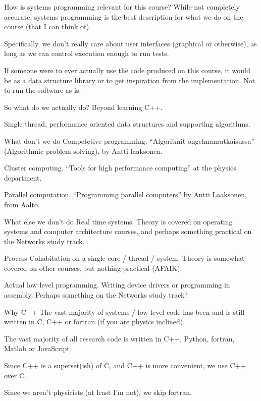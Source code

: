 \documentclass[11pt, aspectratio=169, table]{beamer}
\begin{document}
\begin{frame}{How is systems programming relevant for this course?}
\setlength\parskip{\fill}
\pause
While not completely accurate, systems programming is the best description for what we do on the course (that I can think of).

\pause
Specifically, we don't really care about user interfaces (graphical or otherwise), as long as we can control execution enough to 
run tests.

If someone were to ever actually use the code produced on this course, it would be as a data structure library or to get inspiration from
the implementation. Not to run the software as is.
\end{frame}

\begin{frame}{So what do we actually do?}
\setlength\parskip{\fill}
Beyond learning C++.\pause

Single thread, performance oriented data structures and supporting algorithms.
\end{frame}

\begin{frame}{What don't we do}
\setlength\parskip{\fill}\pause
Competetive programming. ``Algoritmit ongelmanratkaisussa'' (Algorithmic problem solving), by Antti laaksonen.

Cluster computing. ``Tools for high performance computing'' at the physics department.

Parallel computation. ``Programming parallel computers'' by Antti Laaksonen, from Aalto.
\end{frame}

\begin{frame}{What else we don't do}
\setlength\parskip{\fill}\pause
Real time systems. Theory is covered on operating systems and computer architecture courses, and perhaps something practical 
on the Networks study track.

Process Cohabitation on a single core / thread / system. Theory is somewhat covered on other courses, but nothing practical (AFAIK).

Actual low level programming. Writing device drivers or programming in assembly. Perhaps something on the Networks study track?
\end{frame}

\begin{frame}{Why C++}
\setlength\parskip{\fill}\pause
The vast majority of systems / low level code has been and is still written in C, C++ or fortran (if you are physics inclined).

The vast majority of all research code is written in C++, Python, fortran, Matlab or JavaScript

Since C++ is a superset(\alert{ish}) of C, and C++ is more convenient, we use C++ over C.

Since we aren't physicists (at least I'm not), we skip fortran.
\end{frame}
\end{document}
